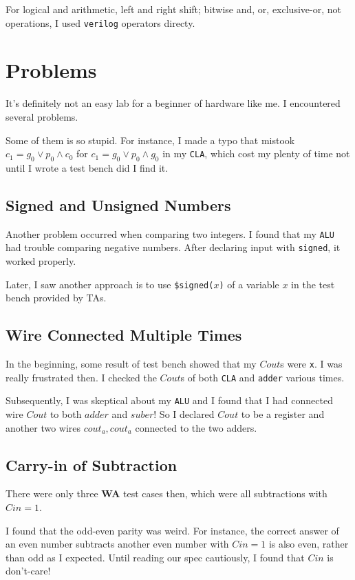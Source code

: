 \documentclass[12pt, a4paper]{article}
\begin{document}
For logical and arithmetic, left and right shift; bitwise and, or, exclusive-or, not operations, I used \texttt{verilog} operators directy.

\section{Problems}

It's definitely not an easy lab for a beginner of hardware like me. I encountered several problems.

Some of them is so stupid. For instance, I made a typo that mistook $c_1=g_0\lor p_0\land c_0$ for $c_1=g_0\lor p_0\land g_0$ in my \texttt{CLA}, which cost my plenty of time not until I wrote a test bench did I find it.

\subsection{Signed and Unsigned Numbers}

Another problem occurred when comparing two integers. I found that my \texttt{ALU} had trouble comparing negative numbers. After declaring input with \texttt{signed}, it worked properly.

Later, I saw another approach is to use \texttt{\$signed($x$)} of a variable $x$ in the test bench provided by TAs.

\subsection{Wire Connected Multiple Times}

In the beginning, some result of test bench showed that my $Cout$s were \texttt{x}. I was really frustrated then. I checked the $Cout$s of both \texttt{CLA} and \texttt{adder} various times.

Subsequently, I was skeptical about my \texttt{ALU} and I found that I had connected wire $Cout$ to both $adder$ and $suber$! So I declared $Cout$ to be a register and another two wires $cout_a,cout_a$ connected to the two adders.

\subsection{Carry-in of Subtraction}

There were only three \textbf{WA} test cases then, which were all subtractions with $Cin=1$.

I found that the odd-even parity was weird. For instance, the correct answer of an even number subtracts another even number with $Cin=1$ is also even, rather than odd as I expected. Until reading our spec cautiously, I found that $Cin$ is don't-care!
\end{document}
